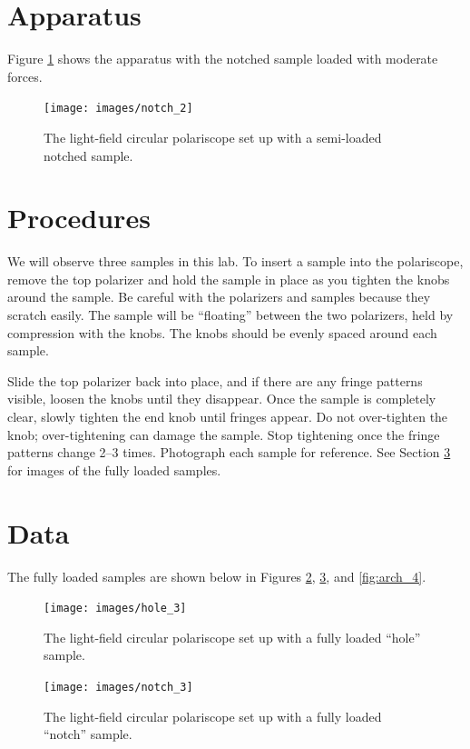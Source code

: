 \documentclass[12 pt]{article}
\begin{document}
\section{Apparatus} \label{apparatus}
Figure \ref{fig:notch_2} shows the apparatus with the notched sample loaded with moderate forces.

\begin{figure}[htbp]
\centering
\texttt{[image: images/notch\_2]}
\caption{The light-field circular polariscope set up with a semi-loaded notched sample.}
\label{fig:notch_2}
\end{figure}

\section{Procedures} \label{procedures}
We will observe three samples in this lab. To insert a sample into the polariscope, remove the top polarizer and hold the sample in place as you tighten the knobs around the sample. Be careful with the polarizers and samples because they scratch easily. The sample will be ``floating'' between the two polarizers, held by compression with the knobs. The knobs should be evenly spaced around each sample.

Slide the top polarizer back into place, and if there are any fringe patterns visible, loosen the knobs until they disappear. Once the sample is completely clear, slowly tighten the end knob until fringes appear. Do not over-tighten the knob; over-tightening can damage the sample. Stop tightening once the fringe patterns change 2--3 times. Photograph each sample for reference. See Section \ref{data} for images of the fully loaded samples.

\section{Data} \label{data}
The fully loaded samples are shown below in Figures \ref{fig:hole_3}, \ref{fig:notch_3}, and \ref{fig:arch_4}.

\begin{figure}[htbp]
\centering
\texttt{[image: images/hole\_3]}
\caption{The light-field circular polariscope set up with a fully loaded ``hole'' sample.}
\label{fig:hole_3}
\end{figure}

\begin{figure}[htbp]
\centering
\texttt{[image: images/notch\_3]}
\caption{The light-field circular polariscope set up with a fully loaded ``notch'' sample.}
\label{fig:notch_3}
\end{figure}
\end{document}

